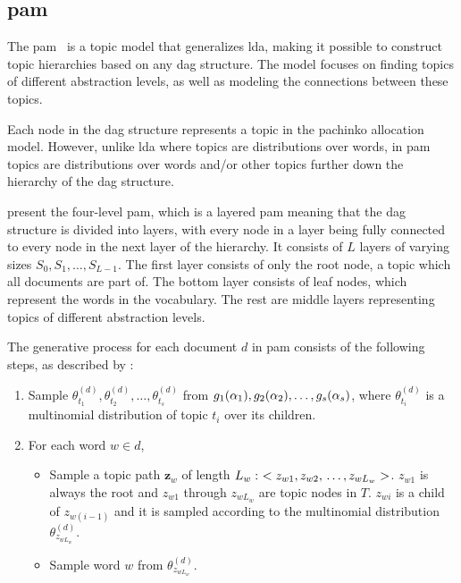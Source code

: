 \subsection{\acrlong{pam}}\label{subsec:pachinko_prelim}
The \acrfull{pam}~\cite{li2006pachinko} is a topic model that generalizes \gls{lda}, making it possible to construct topic hierarchies based on any \gls{dag} structure.
The model focuses on finding topics of different abstraction levels, as well as modeling the connections between these topics.

Each node in the \gls{dag} structure represents a topic in the pachinko allocation model. 
However, unlike \gls{lda} where topics are distributions over words, in \gls{pam} topics are distributions over words and/or other topics further down the hierarchy of the \gls{dag} structure.

\citet{li2006pachinko} present the four-level \gls{pam}, which is a layered \gls{pam} meaning that the \gls{dag} structure is divided into layers, with every node in a layer being fully connected to every node in the next layer of the hierarchy.
It consists of $L$ layers of varying sizes $S_0, S_1, \dots, S_{L-1}$.
The first layer consists of only the root node, a topic which all documents are part of.
The bottom layer consists of leaf nodes, which represent the words in the vocabulary.
The rest are middle layers representing topics of different abstraction levels.

The generative process for each document $d$ in \gls{pam} consists of the following steps, as described by \citet{li2006pachinko}:
\begin{enumerate}
	\item Sample $\theta_{t_1}^{(d)}, \theta_{t_2}^{(d)}, \dots, \theta_{t_s}^{(d)}$ from  $g_1(\alpha_1), g_2(\alpha_2), \dots, \newline g_s(\alpha_s)$, where $\theta_{t_i}^{(d)}$ is a multinomial distribution of topic $t_i$ over its children.
	\item For each word $w \in d$,
	\begin{itemize}
		\item Sample a topic path $\mathbf{z}_w$ of length $L_w:~< z_{w1}, z_{w2},\newline \dots, z_{wL_w} >$. $z_{w1}$ is always the root and $z_{w1}$ through $z_{wL_w}$ are topic nodes in $T$. $z_{wi}$ is a child of $z_{w(i-1)}$ and it is sampled according to the multinomial distribution $\theta_{z_{wL_w}}^{(d)}$.
		\item Sample word $w$ from $\theta_{z_{wL_w}}^{(d)}$.
	\end{itemize}
\end{enumerate}

